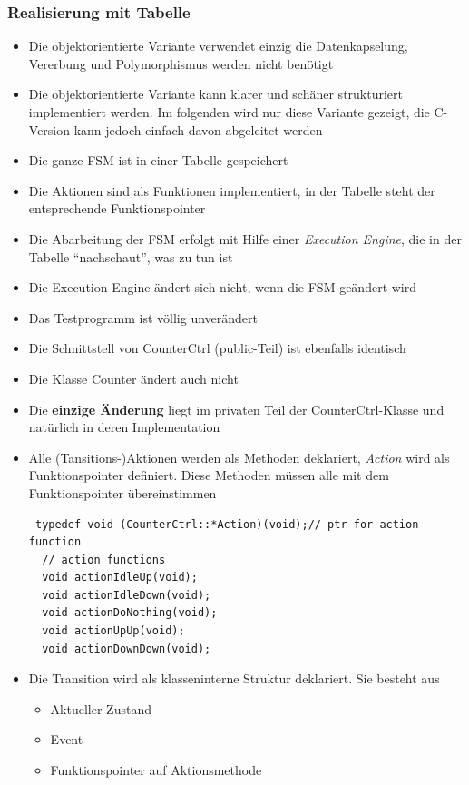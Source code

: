 \subsubsection{Realisierung mit Tabelle}
\begin{itemize}
  \item Die objektorientierte Variante verwendet einzig die Datenkapselung,
  Vererbung und Polymorphismus werden nicht benötigt
  \item Die objektorientierte Variante kann klarer und schäner strukturiert
  implementiert werden. Im folgenden wird nur diese Variante gezeigt, die
  C-Version kann jedoch einfach davon abgeleitet werden
  \item Die ganze FSM ist in einer Tabelle gespeichert
  \item Die Aktionen sind als Funktionen implementiert, in der Tabelle steht der
  entsprechende Funktionspointer
  \item Die Abarbeitung der FSM erfolgt mit Hilfe einer \textit{Execution
  Engine}, die in der Tabelle "`nachschaut"', was zu tun ist
  \item Die Execution Engine ändert sich nicht, wenn die FSM geändert wird
  \item Das Testprogramm ist völlig unverändert
  \item Die Schnittstell von CounterCtrl (public-Teil) ist ebenfalls identisch
  \item Die Klasse Counter ändert auch nicht
  \item Die \textbf{einzige Änderung} liegt im privaten Teil der
  CounterCtrl-Klasse und natürlich in deren Implementation
  \item Alle (Tansitions-)Aktionen werden als Methoden deklariert,
  \textit{Action} wird als Funktionspointer definiert. Diese Methoden müssen
  alle mit dem Funktionspointer übereinstimmen
 \begin{lstlisting}
 typedef void (CounterCtrl::*Action)(void);// ptr for action function
  // action functions 
  void actionIdleUp(void); 
  void actionIdleDown(void); 
  void actionDoNothing(void); 
  void actionUpUp(void); 
  void actionDownDown(void);
 \end{lstlisting}
 \item Die Transition wird als klasseninterne Struktur deklariert. Sie besteht
 aus
 \begin{itemize}
   \item Aktueller Zustand
   \item Event
   \item Funktionspointer auf Aktionsmethode

\end{itemize}
\end{itemize}
